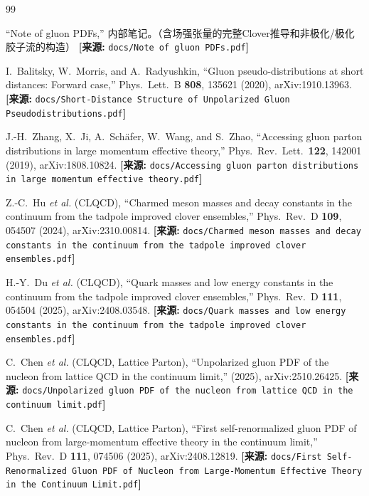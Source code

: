 \documentclass[12pt,a4paper]{ctexart}
\theoremstyle{definition}
\begin{document}
\begin{thebibliography}{99}


``Note of gluon PDFs,''
内部笔记。（含场强张量的完整Clover推导和非极化/极化胶子流的构造）
\quad\textbf{[来源:} \texttt{docs/Note of gluon PDFs.pdf}\textbf{]}

I.~Balitsky, W.~Morris, and A.~Radyushkin,
``Gluon pseudo-distributions at short distances: Forward case,''
Phys.\ Lett.\ B \textbf{808}, 135621 (2020), arXiv:1910.13963.
\quad\textbf{[来源:} \texttt{docs/Short-Distance Structure of Unpolarized Gluon Pseudodistributions.pdf}\textbf{]}

J.-H.~Zhang, X.~Ji, A.~Sch\"afer, W.~Wang, and S.~Zhao,
``Accessing gluon parton distributions in large momentum effective theory,''
Phys.\ Rev.\ Lett.\ \textbf{122}, 142001 (2019), arXiv:1808.10824.
\quad\textbf{[来源:} \texttt{docs/Accessing gluon parton distributions in large momentum effective theory.pdf}\textbf{]}


Z.-C.~Hu \textit{et al.} (CLQCD),
``Charmed meson masses and decay constants in the continuum from the tadpole improved clover ensembles,''
Phys.\ Rev.\ D \textbf{109}, 054507 (2024), arXiv:2310.00814.
\quad\textbf{[来源:} \texttt{docs/Charmed meson masses and decay constants in the continuum from the tadpole improved clover ensembles.pdf}\textbf{]}

H.-Y.~Du \textit{et al.} (CLQCD),
``Quark masses and low energy constants in the continuum from the tadpole improved clover ensembles,''
Phys.\ Rev.\ D \textbf{111}, 054504 (2025), arXiv:2408.03548.
\quad\textbf{[来源:} \texttt{docs/Quark masses and low energy constants in the continuum from the tadpole improved clover ensembles.pdf}\textbf{]}


C.~Chen \textit{et al.} (CLQCD, Lattice Parton),
``Unpolarized gluon PDF of the nucleon from lattice QCD in the continuum limit,''
(2025), arXiv:2510.26425.
\quad\textbf{[来源:} \texttt{docs/Unpolarized gluon PDF of the nucleon from lattice QCD in the continuum limit.pdf}\textbf{]}

C.~Chen \textit{et al.} (CLQCD, Lattice Parton),
``First self-renormalized gluon PDF of nucleon from large-momentum effective theory in the continuum limit,''
Phys.\ Rev.\ D \textbf{111}, 074506 (2025), arXiv:2408.12819.
\quad\textbf{[来源:} \texttt{docs/First Self-Renormalized Gluon PDF of Nucleon from Large-Momentum Effective Theory in the Continuum Limit.pdf}\textbf{]}


\end{thebibliography}
\end{document}
